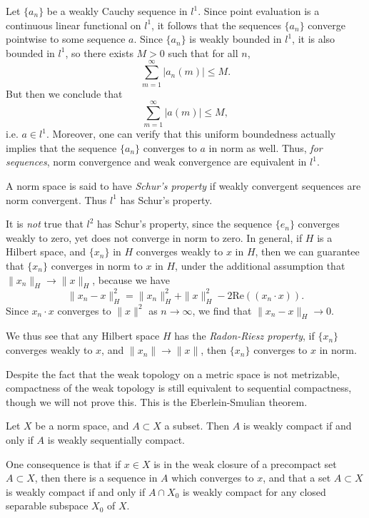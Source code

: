 \begin{example}
    Let $\{ a_n \}$ be a weakly Cauchy sequence in $l^1$. Since point evaluation is a continuous linear functional on $l^1$, it follows that the sequences $\{ a_n \}$ converge pointwise to some sequence $a$. Since $\{ a_n \}$ is weakly bounded in $l^1$, it is also bounded in $l^1$, so there exists $M > 0$ such that for all $n$,
    \[ \sum_{m = 1}^\infty |a_n(m)| \leq M. \]
    But then we conclude that
    \[ \sum_{m = 1}^\infty |a(m)| \leq M, \]
    i.e. $a \in l^1$. Moreover, one can verify that this uniform boundedness actually implies that the sequence $\{ a_n \}$ converges to $a$ in norm as well. Thus, \emph{for sequences}, norm convergence and weak convergence are equivalent in $l^1$.
\end{example}

A norm space is said to have \emph{Schur's property} if weakly convergent sequences are norm convergent. Thus $l^1$ has Schur's property.

\begin{example}
    It is \emph{not} true that $l^2$ has Schur's property, since the sequence $\{ e_n \}$ converges weakly to zero, yet does not converge in norm to zero. In general, if $H$ is a Hilbert space, and $\{ x_n \}$ in $H$ converges weakly to $x$ in $H$, then we can guarantee that $\{ x_n \}$ converges in norm to $x$ in $H$, under the additional assumption that $\| x_n \|_H \to \| x \|_H$, because we have
    \[ \| x_n - x \|_H^2 = \| x_n \|^2_H + \| x \|^2_H - 2 \text{Re}( (x_n \cdot x) ). \]
    Since $x_n \cdot x$ converges to $\| x \|^2$ as $n \to \infty$, we find that $\| x_n - x \|_H \to 0$.
\end{example}

We thus see that any Hilbert space $H$ has the \emph{Radon-Riesz property}, if $\{ x_n \}$ converges weakly to $x$, and $\| x_n \| \to \| x \|$, then $\{ x_n \}$ converges to $x$ in norm.

Despite the fact that the weak topology on a metric space is not metrizable, compactness of the weak topology is still equivalent to sequential compactness, though we will not prove this. This is the Eberlein-Smulian theorem.

\begin{theorem}
    Let $X$ be a norm space, and $A \subset X$ a subset. Then $A$ is weakly compact if and only if $A$ is weakly sequentially compact.
\end{theorem}

One consequence is that if $x \in X$ is in the weak closure of a precompact set $A \subset X$, then there is a sequence in $A$ which converges to $x$, and that a set $A \subset X$ is weakly compact if and only if $A \cap X_0$ is weakly compact for any closed separable subspace $X_0$ of $X$.

